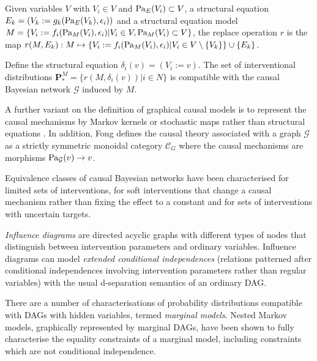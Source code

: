 \begin{definition}
Given variables $V$ with $V_i\in V$ and $\text{Pa}_{E}(V_i)\subset V$, a structural equation $E_k=(V_k:=g_k(\text{Pa}_{E}(V_k),\epsilon_i))$ and a structural equation model $M=\{V_i:=f_i(\text{Pa}_{M}(V_i),\epsilon_i)|V_i\in V, \text{Pa}_{M}(V_i)\subset V\}$, the replace operation $r$ is the map $r(M,E_k):M\mapsto \{V_i:=f_i(\text{Pa}_{M}(V_i),\epsilon_i)|V_i\in V\setminus\{V_k\}\}\cup\{E_k\}$.
\end{definition}

Define the structural equation $\delta_i(v)=(V_i:=v)$. The set of interventional distributions $\mathbf{P}^M_*=\{r(M,\delta_i(v))|i\in N\}$ is compatible with the causal Bayesian network $\mathcal{G}$ induced by $M$\cite{pearl_causality:_2009}.

A further variant on the definition of graphical causal models is to represent the causal mechanisms by Markov kernels or stochastic maps rather than structural equations \cite{eaton_exact_2007,fong_causal_2013}. In addition, Fong defines the causal theory associated with a graph $\mathcal{G}$ as a strictly symmetric monoidal category $\mathcal{C}_G$ where the causal mechanisms are morphisms $\text{Pa}_{\mathcal{G}}(v)\to v$\cite{fong_causal_2013}.

Equivalence classes of causal Bayesian networks have been characterised for limited sets of interventions\cite{hauser_characterization_2012,mooij_joint_2016}, for soft interventions that change a causal mechanism rather than fixing the effect to a constant\cite{yang_characterizing_2018} and for sets of interventions with uncertain targets\cite{eaton_exact_2007}.

\emph{Influence diagrams} are directed acyclic graphs with different types of nodes that distinguish between intervention parameters and ordinary variables. Influence diagrams can model \emph{extended conditional independences} (relations patterned after conditional independences involving intervention parameters rather than regular variables) with the usual d-separation semantics of an ordinary DAG\cite{dawid_beware_2010,dawid_influence_2002}.

There are a number of characterisations of probability distributions compatible with DAGs with hidden variables, termed \emph{marginal models}. Nested Markov models, graphically represented by marginal DAGs, have been shown to fully characterise the equality constraints of a marginal model, including constraints which are not conditional independence\cite{evans_margins_2015,kang_inequality_2012}.

